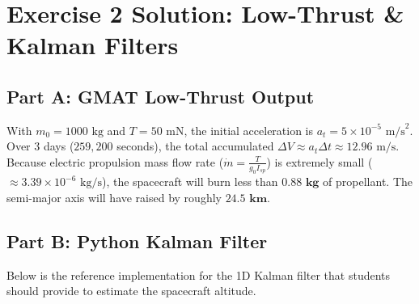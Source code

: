 \documentclass[11pt, letterpaper]{article}
\begin{document}
\section*{Exercise 2 Solution: Low-Thrust \& Kalman Filters}

\subsection*{Part A: GMAT Low-Thrust Output}
With $m_0 = 1000 \text{ kg}$ and $T = 50 \text{ mN}$, the initial acceleration is $a_t = 5 \times 10^{-5} \text{ m/s}^2$. 
Over 3 days ($259,200$ seconds), the total accumulated $\Delta V \approx a_t \Delta t \approx 12.96 \text{ m/s}$. 
Because electric propulsion mass flow rate ($\dot{m} = \frac{T}{g_0 I_{sp}}$) is extremely small ($\approx 3.39 \times 10^{-6} \text{ kg/s}$), the spacecraft will burn less than $\mathbf{0.88 \text{ kg}}$ of propellant. The semi-major axis will have raised by roughly $\mathbf{24.5 \text{ km}}$.

\subsection*{Part B: Python Kalman Filter}
Below is the reference implementation for the 1D Kalman filter that students should provide to estimate the spacecraft altitude.
\end{document}

